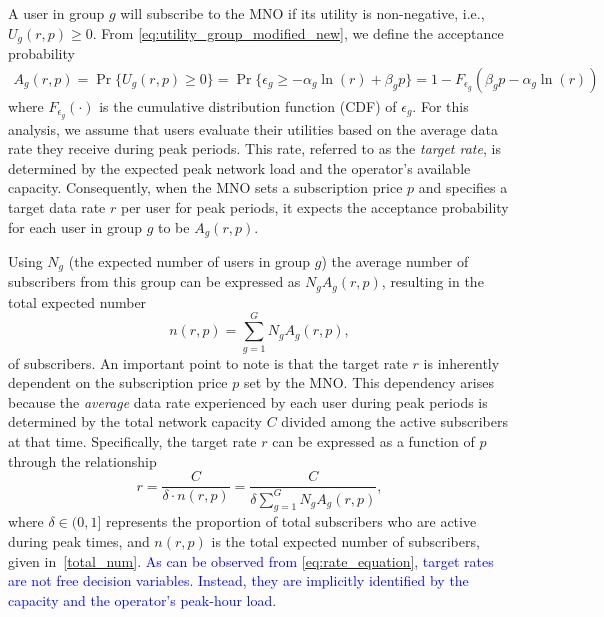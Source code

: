 \documentclass[12pt, draftclsnofoot, onecolumn]{IEEEtran}
\begin{document}
	
	A user in group $g$ will subscribe to the MNO if its utility is non-negative, i.e., $U_g(r, p)\geq 0$.  From \eqref{eq:utility_group_modified_new}, we define the acceptance probability 
	\begin{align}
		A_g(r,p) = \Pr\{U_g(r, p)\geq 0\}= \Pr\{\epsilon_g \geq -\alpha_g \ln(r) + \beta_g p\}
		= 1-F_{\epsilon_g}(\beta_g p-\alpha_g \ln(r))\label{sub_ind}
	\end{align}
	where \( F_{\epsilon_g}(\cdot) \) is the cumulative distribution function (CDF) of \( \epsilon_g \). For this analysis, we assume that users evaluate their utilities based on the average data rate they receive during peak periods. This rate, referred to as the \textit{target rate}, is determined by the expected peak network load and the operator's available capacity. Consequently, when the MNO sets a subscription price \( p \) and specifies a target data rate \( r \) per user for peak periods, it expects the acceptance probability for each user in group \( g \) to be \( A_g(r, p) \).
	
	
	Using \(N_g\) (the expected number of users in group \(g\)) the average number of subscribers from this group can be expressed as \(N_g A_g(r,p)\), resulting in the total expected number
	\begin{equation}
		n(r,p) = \sum_{g=1}^G N_g A_g(r,p),
		\label{total_num}
	\end{equation}
	of subscribers. An important point to note is that the target rate  \( r \)  is inherently dependent on the subscription price \( p \) set by the MNO. This dependency arises because the \textit{average} data rate experienced by each user during peak periods is determined by the total network capacity \( C \) divided among the active subscribers at that time. Specifically, the target rate \( r \) can be expressed as a function of \( p \) through the relationship
	\begin{equation}
		r = \frac{C}{\delta\cdot n(r,p)}= \frac{C}{\delta \sum_{g=1}^G N_g A_g(r,p)} ,
		\label{eq:rate_equation}
	\end{equation}
	where \( \delta \in (0,1] \) represents the proportion of total subscribers who are active during peak times, and \( n(r,p) \) is the total expected number of subscribers, given in~\eqref{total_num}. \textcolor{blue}{As can be observed from \eqref{eq:rate_equation}, target rates are not free decision variables. Instead, they are implicitly identified by the capacity and the operator's peak-hour load}. 
	
\end{document}

